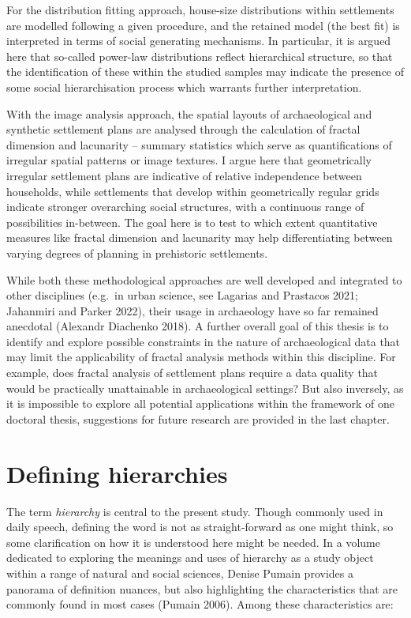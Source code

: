 \documentclass[
  12pt,
  a4paper, twoside]{book}
\begin{document}
For the distribution fitting approach, house-size distributions within settlements are modelled following a given procedure, and the retained model (the best fit) is interpreted in terms of social generating mechanisms. In particular, it is argued here that so-called power-law distributions reflect hierarchical structure, so that the identification of these within the studied samples may indicate the presence of some social hierarchisation process which warrants further interpretation.

With the image analysis approach, the spatial layouts of archaeological and synthetic settlement plans are analysed through the calculation of fractal dimension and lacunarity -- summary statistics which serve as quantifications of irregular spatial patterns or image textures. I argue here that geometrically irregular settlement plans are indicative of relative independence between households, while settlements that develop within geometrically regular grids indicate stronger overarching social structures, with a continuous range of possibilities in-between. The goal here is to test to which extent quantitative measures like fractal dimension and lacunarity may help differentiating between varying degrees of planning in prehistoric settlements.

While both these methodological approaches are well developed and integrated to other disciplines (e.g.~in urban science, see Lagarias and Prastacos 2021; Jahanmiri and Parker 2022), their usage in archaeology have so far remained anecdotal (Alexandr Diachenko 2018). A further overall goal of this thesis is to identify and explore possible constraints in the nature of archaeological data that may limit the applicability of fractal analysis methods within this discipline. For example, does fractal analysis of settlement plans require a data quality that would be practically unattainable in archaeological settings? But also inversely, as it is impossible to explore all potential applications within the framework of one doctoral thesis, suggestions for future research are provided in the last chapter.

\hypertarget{defining-hierarchies}{%
\section{Defining hierarchies}\label{defining-hierarchies}}

The term \emph{hierarchy} is central to the present study. Though commonly used in daily speech, defining the word is not as straight-forward as one might think, so some clarification on how it is understood here might be needed. In a volume dedicated to exploring the meanings and uses of hierarchy as a study object within a range of natural and social sciences, Denise Pumain provides a panorama of definition nuances, but also highlighting the characteristics that are commonly found in most cases (Pumain 2006). Among these characteristics are:
\end{document}
